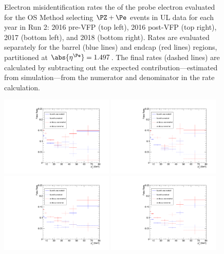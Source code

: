\begin{figure}[!htbp]
\begin{center}
		\caption{
			Electron misidentification rates \vs the \pt of the probe electron evaluated for the OS Method selecting $\PZ + \Pe$ events in UL data
			for each year in Run 2:
			2016 pre-VFP (top left),
			2016 post-VFP (top right),
			2017 (bottom left), and
			2018 (bottom right).
			Rates are evaluated separately for the barrel (blue lines) and endcap (red lines) regions,
			partitioned at $\abs{\eta^{\Pe}} = 1.497$.
			The final rates (dashed lines) are calculated by subtracting out the expected \WZ contribution---estimated from simulation---from the numerator and denominator in the rate calculation.
		}
		\label{fr_plots_el}
	\end{center}
\end{figure}
\begin{figure}[!htbp]
	\begin{center}
		\includegraphics[width=0.48\textwidth]{figures/higgsmassmeas/redbkg/fr/fakerates_UL2016preVFP_mu_yaxis_full.pdf}
		\includegraphics[width=0.48\textwidth]{figures/higgsmassmeas/redbkg/fr/fakerates_UL2016postVFP_mu_yaxis_full.pdf}
		\includegraphics[width=0.48\textwidth]{figures/higgsmassmeas/redbkg/fr/fakerates_UL2017_mu_yaxis_full.pdf}
		\includegraphics[width=0.48\textwidth]{figures/higgsmassmeas/redbkg/fr/fakerates_UL2018_mu_yaxis_full.pdf}

\end{center}
\end{figure}
